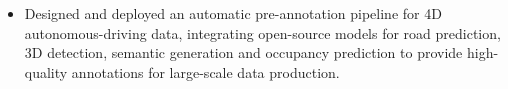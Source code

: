 \begin{itemize}
  \item Designed and deployed an automatic pre-annotation pipeline for 4D autonomous-driving data, integrating open-source models for road prediction, 3D detection, semantic generation and occupancy prediction to provide high-quality annotations for large-scale data production.
\end{itemize}
